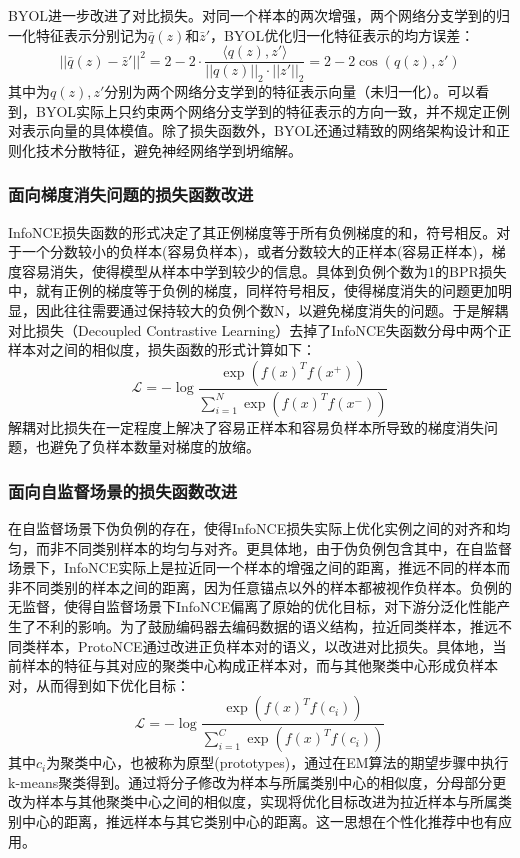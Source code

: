 BYOL\cite{BYOL:2020:NIPS}进一步改进了对比损失。对同一个样本的两次增强，两个网络分支学到的归一化特征表示分别记为$\bar q(z)$和$\bar z\prime $，BYOL优化归一化特征表示的均方误差：
\[||\bar q(z)-\bar z\prime||^2 =2-2\cdot \frac{\langle q(z),z\prime \rangle}{||q(z)||_2\cdot||z\prime||_2  } = 2-2\cos(q(z),z\prime)\]
其中为$q(z),z\prime$分别为两个网络分支学到的特征表示向量（未归一化）。可以看到，BYOL实际上只约束两个网络分支学到的特征表示的方向一致，并不规定正例对表示向量的具体模值。除了损失函数外，BYOL还通过精致的网络架构设计和正则化技术分散特征，避免神经网络学到坍缩解。

\subsubsection{面向梯度消失问题的损失函数改进}
InfoNCE损失函数的形式决定了其正例梯度等于所有负例梯度的和，符号相反。对于一个分数较小的负样本(容易负样本)，或者分数较大的正样本(容易正样本)，梯度容易消失，使得模型从样本中学到较少的信息。具体到负例个数为1的BPR损失中，就有正例的梯度等于负例的梯度，同样符号相反，使得梯度消失的问题更加明显，因此往往需要通过保持较大的负例个数N，以避免梯度消失的问题。于是解耦对比损失\cite{yeh:2022:ECCV}（Decoupled Contrastive Learning）去掉了InfoNCE失函数分母中两个正样本对之间的相似度，损失函数的形式计算如下：
\[
\mathcal{L} = -\log \frac{\exp(f(x)^Tf(x^+))}{\sum_{i=1}^{N}\exp(f(x)^Tf(x^-))}
\]
解耦对比损失在一定程度上解决了容易正样本和容易负样本所导致的梯度消失问题，也避免了负样本数量对梯度的放缩。


\subsubsection{面向自监督场景的损失函数改进}
在自监督场景下伪负例的存在，使得InfoNCE损失实际上优化实例之间的对齐和均匀，而非不同类别样本的均匀与对齐。更具体地，由于伪负例包含其中，在自监督场景下，InfoNCE实际上是拉近同一个样本的增强之间的距离，推远不同的样本而非不同类别的样本之间的距离，因为任意锚点以外的样本都被视作负样本。负例的无监督，使得自监督场景下InfoNCE偏离了原始的优化目标，对下游分泛化性能产生了不利的影响。为了鼓励编码器去编码数据的语义结构，拉近同类样本，推远不同类样本，ProtoNCE\cite{Li:2021:ICLR}通过改进正负样本对的语义，以改进对比损失。具体地，当前样本的特征与其对应的聚类中心构成正样本对，而与其他聚类中心形成负样本对，从而得到如下优化目标：
\[
\mathcal{L} = -\log \frac{\exp(f(x)^Tf(c_i))}{\sum_{i=1}^{C}\exp(f(x)^Tf(c_i))}
\]
其中$c_i$为聚类中心，也被称为原型(prototypes)，通过在EM算法的期望步骤中执行k-means聚类得到。通过将分子修改为样本与所属类别中心的相似度，分母部分更改为样本与其他聚类中心之间的相似度，实现将优化目标改进为拉近样本与所属类别中心的距离，推远样本与其它类别中心的距离。这一思想在个性化推荐中也有应用\cite{lin2022improving}。

